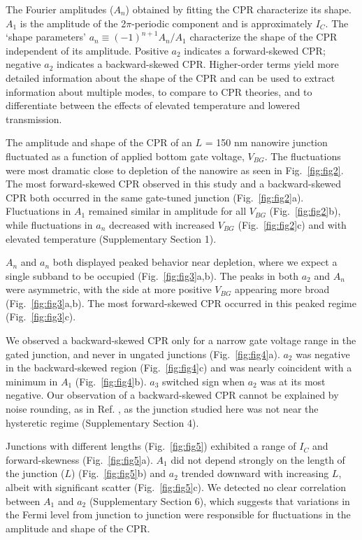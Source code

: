 \documentclass[11pt]{article}
\begin{document}
The Fourier amplitudes ($A_n$) obtained by fitting the CPR characterize its shape. $A_1$ is the amplitude of the 2$\pi$-periodic component and is approximately $I_C$. The `shape parameters' $a_n \equiv (-1)^{n+1} A_n/A_1$ characterize the shape of the CPR independent of its amplitude. Positive $ a_2$ indicates a forward-skewed CPR; negative $a_2$ indicates a backward-skewed CPR. Higher-order terms yield more detailed information about the shape of the CPR and can be used to extract information about multiple modes, to compare to CPR theories, and to differentiate between the effects of elevated temperature and lowered transmission.

The amplitude and shape of the CPR of an $L$ = 150 nm nanowire junction fluctuated as a function of applied bottom gate voltage, $V_{BG}$. The fluctuations were most dramatic close to depletion of the nanowire as seen in Fig.~\ref{fig:fig2}. The most forward-skewed CPR observed in this study and a backward-skewed CPR both occurred in the same gate-tuned junction (Fig.~\ref{fig:fig2}a). Fluctuations in $A_1$ remained similar in amplitude for all $V_{BG}$ (Fig.~\ref{fig:fig2}b), while fluctuations in $a_n$ decreased with increased $V_{BG}$ (Fig.~\ref{fig:fig2}c) and with elevated temperature (Supplementary Section 1).

$A_n$ and $a_n$ both displayed peaked behavior near depletion, where we expect a single subband to be occupied (Fig.~\ref{fig:fig3}a,b). The peaks in both $a_2$ and $A_n$ were asymmetric, with the side at more positive $V_{BG}$ appearing more broad (Fig.~\ref{fig:fig3}a,b). The most forward-skewed CPR occurred in this peaked regime (Fig.~\ref{fig:fig3}c).

We observed a backward-skewed CPR only for a narrow gate voltage range in the gated junction, and never in ungated junctions (Fig.~\ref{fig:fig4}a). $a_2$ was negative in the backward-skewed region (Fig.~\ref{fig:fig4}c) and was nearly coincident with a minimum in $A_1$ (Fig.~\ref{fig:fig4}b). $a_3$ switched sign when $a_2$ was at its most negative. Our observation of a backward-skewed CPR cannot be explained by noise rounding, as in Ref. , as the junction studied here was not near the hysteretic regime (Supplementary Section 4). 

Junctions with different lengths (Fig.~\ref{fig:fig5}) exhibited a range of $I_C$ and forward-skewness (Fig.~\ref{fig:fig5}a). $A_1$ did not depend strongly on the length of the junction ($L$) (Fig.~\ref{fig:fig5}b) and $a_2$ trended downward with increasing $L$, albeit with significant scatter (Fig.~\ref{fig:fig5}c). We detected no clear correlation between $A_1$ and $a_2$ (Supplementary Section 6), which suggests that variations in the Fermi level from junction to junction were responsible for fluctuations in the amplitude and shape of the CPR.
\end{document}
